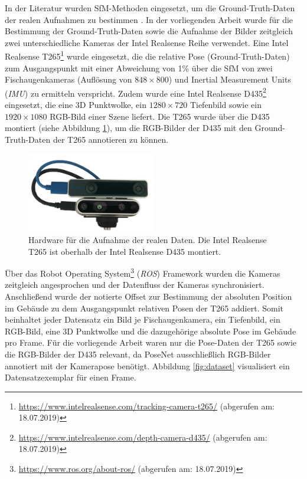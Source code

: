 In der Literatur wurden SfM-Methoden eingesetzt, um die Ground-Truth-Daten der realen Aufnahmen zu bestimmen \cite{kendallPoseNetConvolutionalNetwork2015, clarkVidLocDeepSpatioTemporal2017, acharyaBIMPoseNetIndoorCamera2019}. 
In der vorliegenden Arbeit wurde für die Bestimmung der Ground-Truth-Daten sowie die Aufnahme der Bilder zeitgleich zwei unterschiedliche Kameras der Intel Realsense Reihe verwendet. Eine Intel Realsense T265\footnote{\url{https://www.intelrealsense.com/tracking-camera-t265/} (abgerufen am: 18.07.2019)} wurde eingesetzt, die die relative Pose (Ground-Truth-Daten) zum Ausgangspunkt mit einer Abweichung von 1\%  über die SfM von zwei Fischaugenkameras (Auflösung von $848 \times 800$) und Inertial Measurement Units (\textit{IMU}) zu ermitteln verspricht. Zudem wurde eine Intel Realsense D435\footnote{ \url{https://www.intelrealsense.com/depth-camera-d435/} (abgerufen am: 18.07.2019)} eingesetzt, die eine 3D Punktwolke, ein $1280\times720$ Tiefenbild sowie ein $1920\times1080$ RGB-Bild einer Szene liefert. Die T265 wurde über die D435 montiert (siehe Abbildung \ref{fig:t265_d435}), um die RGB-Bilder der D435 mit den Ground-Truth-Daten der T265 annotieren zu können.

\begin{figure}
	\centering
	\includegraphics[width=0.5\textwidth]{images/real_dataset/t265_d435_2.png}
	\caption{Hardware für die Aufnahme der realen Daten. Die Intel Realsense T265 ist oberhalb der Intel Realsense D435 montiert.}
	\label{fig:t265_d435}
\end{figure}

Über das Robot Operating System\footnote{\url{https://www.ros.org/about-ros/} (abgerufen am: 18.07.2019)} (\textit{ROS}) Framework wurden die Kameras zeitgleich angesprochen und der Datenfluss der Kameras synchronisiert. Anschließend wurde der notierte Offset zur Bestimmung der absoluten Position im Gebäude zu dem Ausgangspunkt relativen Posen der T265 addiert. Somit beinhaltet jeder Datensatz ein Bild je Fischaugenkamera, ein Tiefenbild, ein RGB-Bild, eine 3D Punktwolke und die dazugehörige absolute Pose im Gebäude pro Frame. Für die vorliegende Arbeit waren nur die Pose-Daten der T265 sowie die RGB-Bilder der D435 relevant, da PoseNet ausschließlich RGB-Bilder annotiert mit der Kamerapose benötigt. Abbildung \ref{fig:dataset} visualisiert ein Datensatzexemplar für einen Frame.

